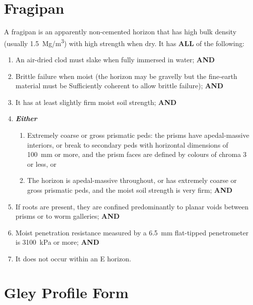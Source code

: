 \documentclass[
  letterpaper,
  DIV=11,
  numbers=noendperiod]{scrreprt}
\providecommand{\tightlist}{%
  \setlength{\itemsep}{0pt}\setlength{\parskip}{0pt}}\usepackage{longtable,booktabs,array}
\begin{document}
\hypertarget{sec-diag-fpan}{%
\section{Fragipan}\label{sec-diag-fpan}}

A fragipan is an apparently non-cemented horizon that has high bulk
density (usually 1.5~Mg/m\textsuperscript{3}) with high strength when
dry. It has \textbf{ALL} of the following:

\begin{enumerate}
\def\labelenumi{\arabic{enumi}.}
\tightlist
\item
  An air-dried clod must slake when fully immersed in water;
  \textbf{AND}
\item
  Brittle failure when moist (the horizon may be gravelly but the
  fine-earth material must be Sufficiently coherent to allow brittle
  failure); \textbf{AND}
\item
  It has at least slightly firm moist soil strength; \textbf{AND}
\item
  \textbf{\emph{Either}}

  \begin{enumerate}
  \def\labelenumii{(\alph{enumii})}
  \tightlist
  \item
    Extremely coarse or gross prismatic peds: the prisms have
    apedal-massive interiors, or break to secondary peds with horizontal
    dimensions of 100~mm or more, and the prism faces are defined by
    colours of chroma 3 or less, or
  \item
    The horizon is apedal-massive throughout, or has extremely coarse or
    gross prismatic peds, and the moist soil strength is very firm;
    \textbf{AND}
  \end{enumerate}
\item
  If roots are present, they are confined predominantly to planar voids
  between prisms or to worm galleries; \textbf{AND}
\item
  Moist penetration resistance measured by a 6.5~mm flat-tipped
  penetrometer is 3100~kPa or more; \textbf{AND}
\item
  It does not occur within an E horizon.
\end{enumerate}

\hypertarget{sec-diag-gleypf}{%
\section{Gley Profile Form}\label{sec-diag-gleypf}}
\end{document}
